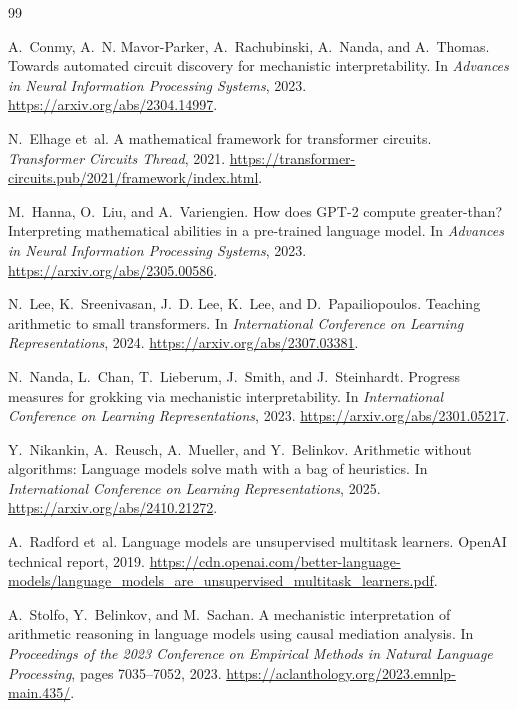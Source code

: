 \documentclass[11pt]{article}
\begin{document}
\begin{thebibliography}{99}

A.~Conmy, A.~N. Mavor-Parker, A.~Rachubinski, A.~Nanda, and A.~Thomas.
\newblock Towards automated circuit discovery for mechanistic interpretability.
\newblock In \emph{Advances in Neural Information Processing Systems}, 2023.
\newblock \url{https://arxiv.org/abs/2304.14997}.

N.~Elhage et~al.
\newblock A mathematical framework for transformer circuits.
\newblock \emph{Transformer Circuits Thread}, 2021.
\newblock \url{https://transformer-circuits.pub/2021/framework/index.html}.

M.~Hanna, O.~Liu, and A.~Variengien.
\newblock How does GPT-2 compute greater-than? Interpreting mathematical abilities in a pre-trained language model.
\newblock In \emph{Advances in Neural Information Processing Systems}, 2023.
\newblock \url{https://arxiv.org/abs/2305.00586}.

N.~Lee, K.~Sreenivasan, J.~D. Lee, K.~Lee, and D.~Papailiopoulos.
\newblock Teaching arithmetic to small transformers.
\newblock In \emph{International Conference on Learning Representations}, 2024.
\newblock \url{https://arxiv.org/abs/2307.03381}.

N.~Nanda, L.~Chan, T.~Lieberum, J.~Smith, and J.~Steinhardt.
\newblock Progress measures for grokking via mechanistic interpretability.
\newblock In \emph{International Conference on Learning Representations}, 2023.
\newblock \url{https://arxiv.org/abs/2301.05217}.

Y.~Nikankin, A.~Reusch, A.~Mueller, and Y.~Belinkov.
\newblock Arithmetic without algorithms: Language models solve math with a bag of heuristics.
\newblock In \emph{International Conference on Learning Representations}, 2025.
\newblock \url{https://arxiv.org/abs/2410.21272}.

A.~Radford et~al.
\newblock Language models are unsupervised multitask learners.
\newblock OpenAI technical report, 2019.
\newblock \url{https://cdn.openai.com/better-language-models/language_models_are_unsupervised_multitask_learners.pdf}.

A.~Stolfo, Y.~Belinkov, and M.~Sachan.
\newblock A mechanistic interpretation of arithmetic reasoning in language models using causal mediation analysis.
\newblock In \emph{Proceedings of the 2023 Conference on Empirical Methods in Natural Language Processing}, pages 7035--7052, 2023.
\newblock \url{https://aclanthology.org/2023.emnlp-main.435/}.


\end{thebibliography}
\end{document}
